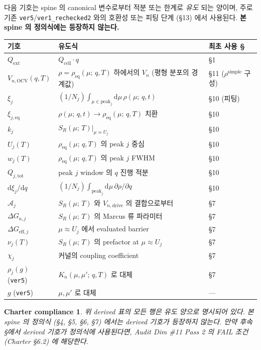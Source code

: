 \documentclass[11pt,a4paper]{article}
\newtheorem*{charter}{Charter compliance}
\newcommand{\dd}{\mathrm{d}}
\newcommand{\OCV}{\mathrm{OCV}}
\newcommand{\drive}{\mathrm{drive}}
\newcommand{\eff}{\mathrm{eff}}
\newcommand{\eq}{\mathrm{eq}}
\newcommand{\tot}{\mathrm{tot}}
\newcommand{\cell}{\mathrm{cell}}
\newcommand{\ext}{\mathrm{ext}}
\newcommand{\mucont}{\mu}
\newcommand{\rhoeq}{\rho_{\eq}(\mucont;\, q, T)}
\newcommand{\rhomut}{\rho(\mucont;\, q, t)}
\newcommand{\Sreact}{S_R(\mucont;\, T)}
\newcommand{\Kncross}{K_n(\mucont, \mucont';\, q, T)}
\begin{document}
다음 기호는 spine 의 canonical 변수로부터 적분 또는 한계로 \emph{유도} 되는 양이며,
주로 기존 \texttt{ver5}/\texttt{ver1\_rechecked2} 와의 호환성 또는 피팅 단계
(\S 13) 에서 사용된다. \textbf{본 spine 의 정의식에는 등장하지 않는다.}

\begin{longtable}{p{} p{} p{}}
\toprule
기호 & 유도식 & 최초 사용 \S \\
\midrule
\endhead
$Q_{\ext}$ & $Q_{\cell} \cdot q$ & §1 \\
$V_{n,\OCV}(q, T)$ & $\rho = \rhoeq$ 하에서의 $V_n$ (평형 분포의 경계값) & §11
    ($\rho^{\text{simple}}$ 구성) \\
$\xi_j$ & $(1/N_j) \int_{\mucont \in \text{peak}_j} \dd\mucont\, \rhomut$ & §10
    (피팅) \\
$\xi_{j,\eq}$ & $\rhomut \to \rhoeq$ 치환 & §10 \\
$k_j$ & $\Sreact|_{\mucont \approx U_j}$ & §10 \\
$U_j(T)$ & $\rhoeq$ 의 peak $j$ 중심 & §10 \\
$w_j(T)$ & $\rhoeq$ 의 peak $j$ FWHM & §10 \\
$Q_{j,\tot}$ & peak $j$ window 의 $q$ 진행 적분 & §10 \\
$\dd\xi_j/\dd q$ & $(1/N_j) \int_{\text{peak}_j} \dd\mucont\, \partial \rho / \partial q$ & §10 \\
$\mathcal A_j$ & $\Sreact$ 와 $V_{n,\drive}$ 의 결합으로부터 & §7 \\
$\Delta G_{a,j}$ & $\Sreact$ 의 Marcus 류 파라미터 & §7 \\
$\Delta G_{\eff,j}$ & $\mucont \approx U_j$ 에서 evaluated barrier & §7 \\
$\nu_j(T)$ & $\Sreact$ 의 prefactor at $\mucont \approx U_j$ & §7 \\
$\chi_j$ & 커널의 coupling coefficient & §7 \\
$\rho_j(g)$ (\texttt{ver5}) & $\Kncross$ 로 대체 & §7 \\
$g$ (\texttt{ver5}) & $\mucont, \mucont'$ 로 대체 & — \\
\bottomrule
\end{longtable}

\begin{charter}
위 derived 표의 모든 행은 \emph{유도} 양으로 명시되어 있다. 본 spine 의 정의식
(\S 4, \S 5, \S 6, \S 7) 에서는 derived 기호가 등장하지 않는다. 만약 후속 \S 에서
derived 기호가 정의식에 사용된다면, Audit Dim \#11 Pass 2 의 FAIL 조건 (Charter
\S 6.2) 에 해당한다.
\end{charter}
\end{document}
